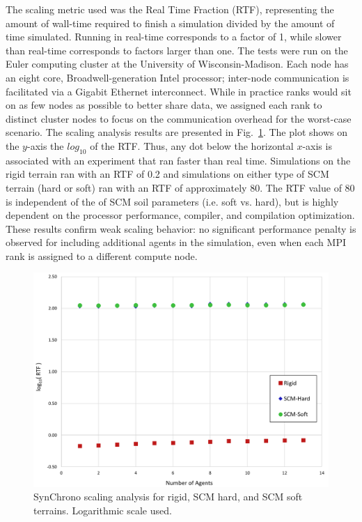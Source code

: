 \documentclass[12pt,twocolumn]{article}
\newcommand{\chrono}{Chrono}
\newcommand{\synchrono}{Syn\chrono{}}
\begin{document}
The scaling metric used was the Real Time Fraction (RTF), representing the amount of wall-time required to finish a simulation divided by the amount of time simulated. Running in real-time corresponds to a factor of 1, while slower than real-time corresponds to factors larger than one. The tests were run on the Euler computing cluster at the University of Wisconsin-Madison. Each node has an eight core, Broadwell-generation Intel processor; inter-node communication is facilitated via a Gigabit Ethernet interconnect. While in practice ranks would sit on as few nodes as possible to better share data, we assigned each rank to distinct cluster nodes to focus on the communication overhead for the worst-case scenario. The scaling analysis results are presented in Fig.~\ref{fig:scmscaling}. The plot shows on the $y$-axis the $ log_{10} $ of the RTF. Thus, any dot below the horizontal $x$-axis is associated with an experiment that ran faster than real time. Simulations on the rigid terrain ran with an RTF of 0.2 and simulations on either type of SCM terrain (hard or soft) ran with an RTF of approximately 80. The RTF value of 80 is independent of the of SCM soil parameters (i.e. soft vs. hard), but is highly dependent on the processor performance, compiler, and compilation optimization. These results confirm weak scaling behavior: no significant performance penalty is observed for including additional agents in the simulation, even when each MPI rank is assigned to a different compute node. 

\begin{figure}
    \centering
    \includegraphics[width=\columnwidth]{Figs/syn_SCM_scaling.png}
    \caption{\synchrono{} scaling analysis for rigid, SCM hard, and SCM soft terrains. Logarithmic scale used.}   
    \label{fig:scmscaling}
\end{figure}
\end{document}
